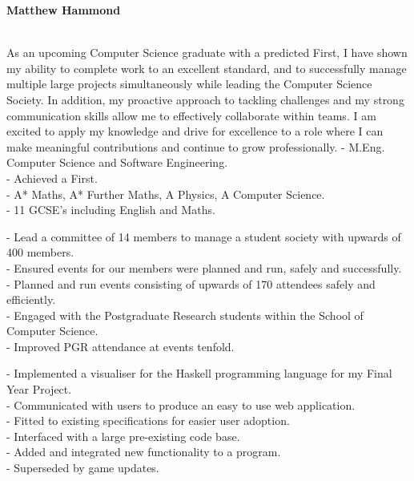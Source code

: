 \documentclass[twoside]{article}
\begin{document}
\selectfont
\begin{center}
    \noindent\huge\textbf{Matthew Hammond}
\end{center}\hr
{}
\hfill
{}\\
\hfill
{}\hr
As an upcoming Computer Science graduate with a predicted First, I have shown my ability to complete work to an excellent standard, and to successfully manage multiple large projects simultaneously while leading the Computer Science Society. In addition, my proactive approach to tackling challenges and my strong communication skills allow me to effectively collaborate within teams. I am excited to apply my knowledge and drive for excellence to a role where I can make meaningful contributions and continue to grow professionally.
- M.Eng. Computer Science and Software Engineering.\\
- Achieved a First.\vspace{2pt}\\
- A* Maths, A* Further Maths, A Physics, A Computer Science.\vspace{2pt}\\
- 11 GCSE's including English and Maths.

- Lead a committee of 14 members to manage a student society with upwards of 400 members.\\
- Ensured events for our members were planned and run, safely and successfully.\\
- Planned and run events consisting of upwards of 170 attendees safely and efficiently.\\
- Engaged with the Postgraduate Research students within the School of Computer Science.\\
- Improved PGR attendance at events tenfold.

- Implemented a visualiser for the Haskell programming language for my Final Year Project.\\
- Communicated with users to produce an easy to use web application.\\
- Fitted to existing specifications for easier user adoption.\\
- Interfaced with a large pre-existing code base.\\
- Added and integrated new functionality to a program.\\
- Superseded by game updates.
\end{document}
